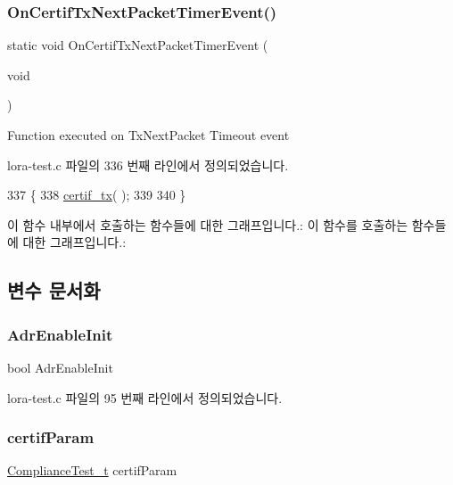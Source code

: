 \subsubsection{\texorpdfstring{On\+Certif\+Tx\+Next\+Packet\+Timer\+Event()}{OnCertifTxNextPacketTimerEvent()}}
{\footnotesize\ttfamily static void On\+Certif\+Tx\+Next\+Packet\+Timer\+Event (\begin{DoxyParamCaption}\item[{void}]{ }\end{DoxyParamCaption})\hspace{0.3cm}{\ttfamily [static]}}



Function executed on Tx\+Next\+Packet Timeout event 



lora-\/test.\+c 파일의 336 번째 라인에서 정의되었습니다.


\begin{DoxyCode}
337 \{
338     \mbox{\hyperlink{lora-test_8c_a735361add977554215fd3e1e70b74760}{certif\_tx}}( );
339 
340 \}
\end{DoxyCode}
이 함수 내부에서 호출하는 함수들에 대한 그래프입니다.\+:
이 함수를 호출하는 함수들에 대한 그래프입니다.\+:


\subsection{변수 문서화}
\mbox{\label{lora-test_8c_ac9f809d4636721961e690fd82f6bafc7}} 
\subsubsection{\texorpdfstring{Adr\+Enable\+Init}{AdrEnableInit}}
{\footnotesize\ttfamily bool Adr\+Enable\+Init\hspace{0.3cm}{\ttfamily [static]}}



lora-\/test.\+c 파일의 95 번째 라인에서 정의되었습니다.

\mbox{\label{lora-test_8c_afed64ac962fb28f92cbc92acb72b0b7a}} 
\subsubsection{\texorpdfstring{certif\+Param}{certifParam}}
{\footnotesize\ttfamily \mbox{\hyperlink{lora-test_8c_a53a6b20274f31e34166b30bb372bb6aa}{Compliance\+Test\+\_\+t}} certif\+Param\hspace{0.3cm}{\ttfamily [static]}}



